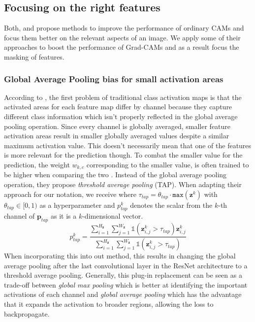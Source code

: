 \subsection{Focusing on the right features}
Both, \citet{sun2020fixing} and \citet{Bae2020RethinkingCAM} propose methods to improve the performance of ordinary CAMs and focus them better on the relevant aspects of an image. We apply some of their approaches to boost the performance of Grad-CAMs and as a result focus the masking of features. 

\subsubsection{Global Average Pooling bias for small activation areas}
According to \citet{Bae2020RethinkingCAM}, the first problem of traditional class activation maps is that the activated areas for each feature map differ by channel because they capture different class information which isn't properly reflected in the global average pooling operation. Since every channel is globally averaged, smaller feature activation areas result in smaller globally averaged values despite a similar maximum activation value. This doesn't necessarily mean that one of the features is more relevant for the prediction though. To combat the smaller value for the prediction, the weight $w_{k,c}$ corresponding to the smaller value, is often trained to be higher when comparing the two \citep{Bae2020RethinkingCAM}. Instead of the global average pooling operation, they propose \emph{threshold average pooling} (TAP). When adapting their approach for our notation, we receive  where $\tau_{t a p} = \theta_{tap} \cdot \mathtt{max}(\mathbf{z}^k)$ with $\theta_{tap} \in [0,1)$ as a hyperparameter and $p^k_{tap}$ denotes the scalar from the $k$-th channel of $\mathbf{p}_{tap}$ as it is a $k$-dimensional vector. 
\begin{equation}
\label{eq:tap}
p^k_{tap} =\frac{\sum_{i=1}^{H_\mathbf{z}} \sum_{j=1}^{W_\mathbf{z}} \mathbb{1}\left(\mathbf{z}^k_{i,j} > \tau_{t a p}\right) \mathbf{z}^k_{i,j}}{\sum_{i=1}^{H_\mathbf{z}} \sum_{j=1}^{W_\mathbf{z}} \mathbb{1}\left(\mathbf{z}^k_{i,j} > \tau_{t a p}\right)}
\end{equation}
When incorporating this into out method, this results in changing the global average pooling after the last convolutional layer in the ResNet architecture to a threshold average pooling. Generally, this plug-in replacement can be seen as a trade-off between \emph{global max pooling} which is better at identifying the important activations of each channel and \emph{global average pooling} which has the advantage that it expands the activation to broader regions, allowing the loss to backpropagate.

